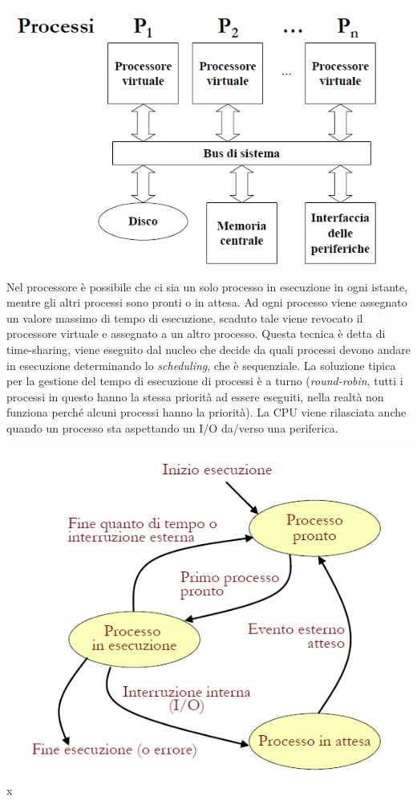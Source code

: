 \documentclass[
  paper=a4,
  oneside  ,captions=tableheading
]{scrbook}
\begin{document}
\includegraphics{./image/image-20201123234616173.png}

Nel processore è possibile che ci sia un solo processo in esecuzione in
ogni istante, mentre gli altri processi sono pronti o in attesa. Ad ogni
processo viene assegnato un valore massimo di tempo di esecuzione,
scaduto tale viene revocato il processore virtuale e assegnato a un
altro processo. Questa tecnica è detta di time-sharing, viene eseguito
dal nucleo che decide da quali processi devono andare in esecuzione
determinando lo \emph{scheduling}, che è sequenziale. La soluzione
tipica per la gestione del tempo di esecuzione di processi è a turno
(\emph{round-robin}, tutti i processi in questo hanno la stessa priorità
ad essere eseguiti, nella realtà non funziona perché alcuni processi
hanno la priorità). La CPU viene rilasciata anche quando un processo sta
aspettando un I/O da/verso una periferica.

\includegraphics{./image/image-20201123235406308.png}x
\end{document}
